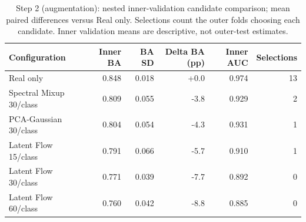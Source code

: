 \begin{table}[t]
\centering
\caption{Step 2 (augmentation): nested inner-validation candidate comparison; mean paired differences versus Real only. Selections count the outer folds choosing each candidate. Inner validation means are descriptive, not outer-test estimates.}
\label{tab:step2_candidates}
\footnotesize
\setlength{\tabcolsep}{4pt}
\begin{tabular}{lrrrrr}
\toprule
Configuration & Inner BA & BA SD & Delta BA (pp) & Inner AUC & Selections \\
\midrule
Real only & 0.848 & 0.018 & +0.0 & 0.974 & 13 \\
Spectral Mixup 30/class & 0.809 & 0.055 & -3.8 & 0.929 & 2 \\
PCA-Gaussian 30/class & 0.804 & 0.054 & -4.3 & 0.931 & 1 \\
Latent Flow 15/class & 0.791 & 0.066 & -5.7 & 0.910 & 1 \\
Latent Flow 30/class & 0.771 & 0.039 & -7.7 & 0.892 & 0 \\
Latent Flow 60/class & 0.760 & 0.042 & -8.8 & 0.885 & 0 \\
\bottomrule
\end{tabular}
\end{table}
